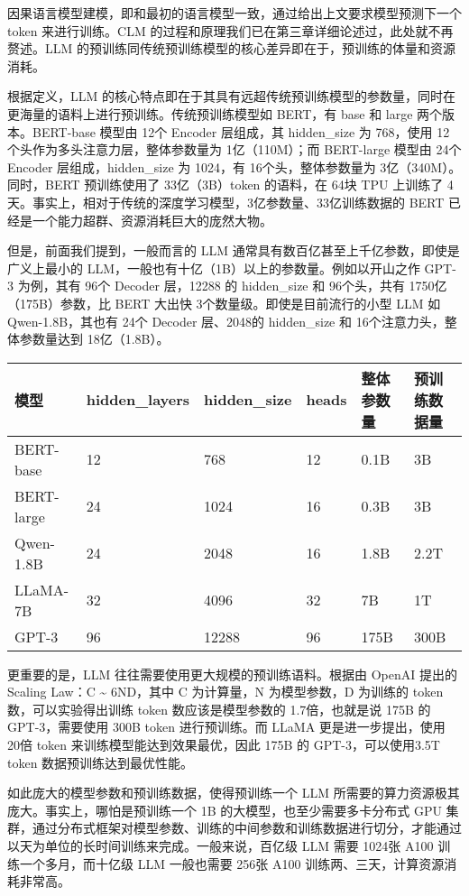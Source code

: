 \documentclass[12pt,a4paper]{book}
\begin{document}
因果语言模型建模，即和最初的语言模型一致，通过给出上文要求模型预测下一个
token 来进行训练。CLM
的过程和原理我们已在第三章详细论述过，此处就不再赘述。LLM
的预训练同传统预训练模型的核心差异即在于，预训练的体量和资源消耗。

根据定义，LLM
的核心特点即在于其具有远超传统预训练模型的参数量，同时在更海量的语料上进行预训练。传统预训练模型如
BERT，有 base 和 large 两个版本。BERT-base 模型由 12个 Encoder
层组成，其 hidden\_size 为 768，使用
12个头作为多头注意力层，整体参数量为 1亿（110M）；而 BERT-large 模型由
24个 Encoder 层组成，hidden\_size 为 1024，有 16个头，整体参数量为
3亿（340M）。同时，BERT 预训练使用了 33亿（3B）token 的语料，在 64块 TPU
上训练了
4天。事实上，相对于传统的深度学习模型，3亿参数量、33亿训练数据的 BERT
已经是一个能力超群、资源消耗巨大的庞然大物。

但是，前面我们提到，一般而言的 LLM
通常具有数百亿甚至上千亿参数，即使是广义上最小的
LLM，一般也有十亿（1B）以上的参数量。例如以开山之作 GPT-3 为例，其有
96个 Decoder 层，12288 的 hidden\_size 和 96个头，共有
1750亿（175B）参数，比 BERT 大出快 3个数量级。即使是目前流行的小型 LLM
如 Qwen-1.8B，其也有 24个 Decoder 层、2048的 hidden\_size 和
16个注意力头，整体参数量达到 18亿（1.8B）。

\begin{longtable}[]{@{}llllll@{}}
\toprule\noalign{}
模型 & hidden\_layers & hidden\_size & heads & 整体参数量 &
预训练数据量 \\
\midrule\noalign{}
\endhead
\bottomrule\noalign{}
\endlastfoot
BERT-base & 12 & 768 & 12 & 0.1B & 3B \\
BERT-large & 24 & 1024 & 16 & 0.3B & 3B \\
Qwen-1.8B & 24 & 2048 & 16 & 1.8B & 2.2T \\
LLaMA-7B & 32 & 4096 & 32 & 7B & 1T \\
GPT-3 & 96 & 12288 & 96 & 175B & 300B \\
\end{longtable}

更重要的是，LLM 往往需要使用更大规模的预训练语料。根据由 OpenAI 提出的
Scaling Law：C \textasciitilde{} 6ND，其中 C 为计算量，N 为模型参数，D
为训练的 token 数，可以实验得出训练 token 数应该是模型参数的
1.7倍，也就是说 175B 的 GPT-3，需要使用 300B token 进行预训练。而 LLaMA
更是进一步提出，使用 20倍 token 来训练模型能达到效果最优，因此 175B 的
GPT-3，可以使用3.5T token 数据预训练达到最优性能。

如此庞大的模型参数和预训练数据，使得预训练一个 LLM
所需要的算力资源极其庞大。事实上，哪怕是预训练一个 1B
的大模型，也至少需要多卡分布式 GPU
集群，通过分布式框架对模型参数、训练的中间参数和训练数据进行切分，才能通过以天为单位的长时间训练来完成。一般来说，百亿级
LLM 需要 1024张 A100 训练一个多月，而十亿级 LLM 一般也需要 256张 A100
训练两、三天，计算资源消耗非常高。
\end{document}
